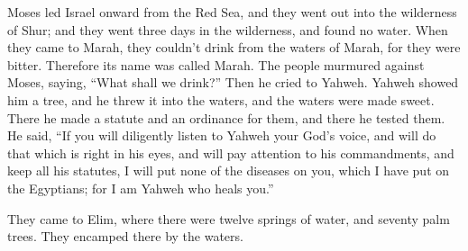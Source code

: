 {\par }{\PP {}Moses led Israel onward from the Red Sea, and they went out into the wilderness of Shur; and they went three days in the wilderness, and found no water.
When they came to Marah, they couldn’t drink from the waters of Marah, for they were bitter. Therefore its name was called Marah.
The people murmured against Moses, saying, “What shall we drink?”
Then he cried to Yahweh. Yahweh showed him a tree, and he threw it into the waters, and the waters were made sweet. There he made a statute and an ordinance for them, and there he tested them.
He said, “If you will diligently listen to Yahweh your God’s voice, and will do that which is right in his eyes, and will pay attention to his commandments, and keep all his statutes, I will put none of the diseases on you, which I have put on the Egyptians; for I am Yahweh who heals you.”
\par }{\PP {}They came to Elim, where there were twelve springs of water, and seventy palm trees. They encamped there by the waters.

}
